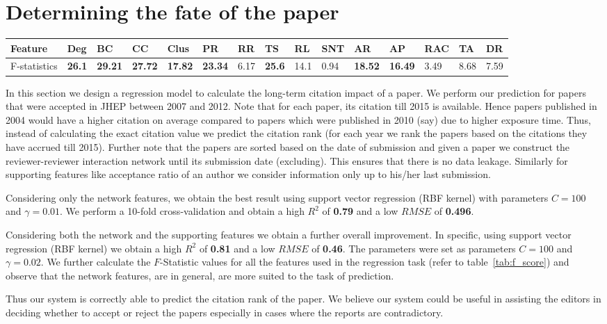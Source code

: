 \section{Determining the fate of the paper}
\label{performance_measure}

\begin{table*}[]
\centering
\caption{The F-statistics value for all the features used for predicting the long-term citation of the paper.}
\label{tab:f_score}
\begin{tabular}{|l|l|l|l|l|l|l|l|l|l|l|l|l|l|l|}
\hline
Feature      & Deg  & BC    & CC    & Clus  & PR    & RR   & TS   & RL   & SNT  & AR    & AP    & RAC  & TA   & DR   \\ \hline
F-statistics & {\bf 26.1} & {\bf 29.21} & {\bf 27.72} & {\bf 17.82} & {\bf 23.34} & 6.17 & {\bf 25.6} & 14.1 & 0.94 & {\bf 18.52} & {\bf 16.49} & 3.49 & 8.68 & 7.59 \\ \hline
\end{tabular}
\end{table*}


In this section we design a regression model to calculate the long-term citation impact of a paper. 
We perform our prediction for papers that were accepted in JHEP between 2007 and 2012. Note that for each paper, its citation till 2015 is available. Hence papers published in 2004 would have a higher citation on average compared to papers which were published in 2010 (say) due to higher exposure time. Thus, instead of calculating  the exact citation value we predict the citation rank (for each year we rank the papers based on the citations they have accrued till 2015). Further note that the papers are sorted based on the date of submission and given a paper we construct the reviewer-reviewer interaction network until its submission date (excluding). This ensures that there is no data leakage. Similarly for supporting features like acceptance ratio of an author we consider information only up to his/her last submission. 

 Considering only the network features, we obtain the best result using support vector regression (RBF kernel) with parameters $C=100$ and $\gamma=0.01$. We perform a 10-fold cross-validation and obtain a high $R^2$ of {\bf 0.79} and a low $RMSE$ of {\bf 0.496}. 

 Considering both the network and the supporting features we obtain a further overall improvement. In specific, using support vector regression (RBF kernel) we obtain a high $R^2$ of {\bf 0.81} and a low $RMSE$ of {\bf 0.46}. The parameters were set as parameters $C=100$ and $\gamma=0.02$. We further calculate the $F$-Statistic values for all the features used in the regression task (refer to table~\ref{tab:f_score}) and observe that the network features, are in general, are more suited to the task of prediction.


Thus our system is correctly able to predict the citation rank of the paper. We believe our system could be useful in assisting the editors in deciding whether to accept or reject the papers especially in cases where the reports are contradictory. 
\medskip